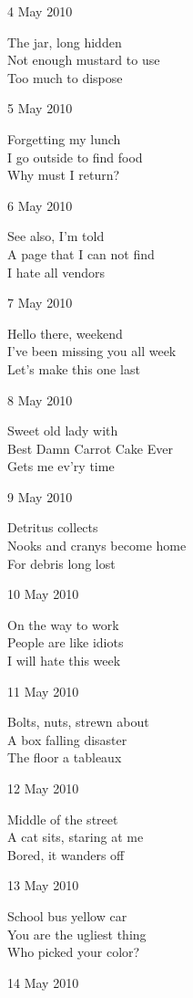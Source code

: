 \documentclass[12pt]{article}
\begin{document}
\newpage

4 May 2010

The jar, long hidden \\
Not enough mustard to use \\
Too much to dispose

5 May 2010

Forgetting my lunch \\
I go outside to find food \\
Why must I return?

6 May 2010

See also, I'm told \\
A page that I can not find \\
I hate all vendors

7 May 2010

Hello there, weekend \\
I've been missing you all week \\
Let's make this one last

8 May 2010

Sweet old lady with \\
Best Damn Carrot Cake Ever \\
Gets me ev'ry time

9 May 2010

Detritus collects \\
Nooks and cranys become home \\
For debris long lost

10 May 2010

On the way to work \\
People are like idiots \\
I will hate this week


\newpage

11 May 2010

Bolts, nuts, strewn about \\
A box falling disaster \\
The floor a tableaux

12 May 2010

Middle of the street \\
A cat sits, staring at me \\
Bored, it wanders off

13 May 2010

School bus yellow car \\
You are the ugliest thing \\
Who picked your color?

14 May 2010
\end{document}
